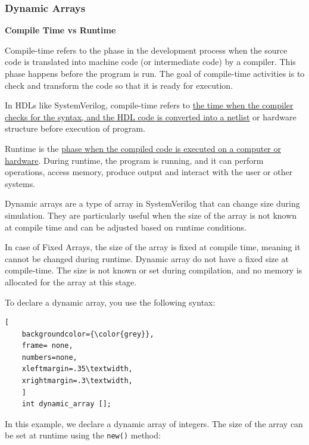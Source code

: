 \documentclass[12pt, a4paper]{article}
\begin{document}
\subsubsection{Dynamic Arrays}

\textbf{Compile Time vs Runtime}

Compile-time refers to the phase in the development process when the source code is translated into machine code (or intermediate code) by a compiler. This phase happens before the program is run. The goal of compile-time activities is to check and transform the code so that it is ready for execution.

\vspace{0.5em}

In HDLs like SystemVerilog, compile-time refers to \ul{the time when the compiler checks for the syntax, and the HDL code is converted into a netlist} or hardware structure before execution of program.

\vspace{0.5em}

Runtime is the \ul{phase when the compiled code is executed on a computer or hardware}. During runtime, the program is running, and it can perform operations, access memory, produce output and interact with the user or other systems.

\vspace{1em}

Dynamic arrays are a type of array in SystemVerilog that can change size during simulation. They are particularly useful when the size of the array is not known at compile time and can be adjusted based on runtime conditions.

In case of Fixed Arrays, the size of the array is fixed at compile time, meaning it cannot be changed during runtime. Dynamic array do not have a fixed size at compile-time. The size is not known or set during compilation, and no memory is allocated for the array at this stage.

To declare a dynamic array, you use the following syntax:

\begin{lstlisting}[
    backgroundcolor={\color{grey}},
    frame= none,
    numbers=none,
    xleftmargin=.35\textwidth,
    xrightmargin=.3\textwidth, 
    ]
    int dynamic_array [];
\end{lstlisting}

In this example, we declare a dynamic array of integers. The size of the array can be set at runtime using the \texttt{new()} method:
\end{document}
